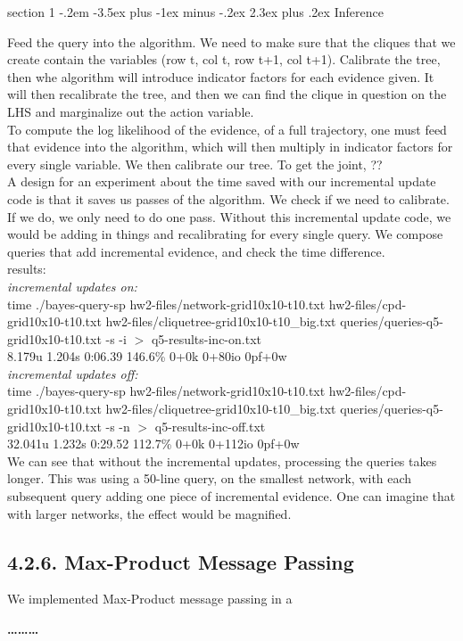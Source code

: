 \documentclass[12pt]{article}
\makeatletter
\newenvironment{problem}{\@startsection
       {section}
       {1}
       {-.2em}
       {-3.5ex plus -1ex minus -.2ex}
       {2.3ex plus .2ex}
       {\pagebreak[3]%
       \large\bf\noindent{Problem }
       }
       }
       {%
       \begin{center}\large\bf \ldots\ldots\ldots\end{center}}
\makeatother
\begin{document}
\begin{problem}{Inference}

Feed the query into the algorithm.  We need to make sure that the cliques that we create contain the variables (row t, col t, row t+1, col t+1).  Calibrate the tree, then whe algorithm will introduce indicator factors for each evidence given.  It will then recalibrate the tree, and then we can find the clique in question on the LHS and marginalize out the action variable.\\

To compute the log likelihood of the evidence, of a full trajectory, one must feed that evidence into the algorithm, which will then multiply in indicator factors for every single variable.  We then calibrate our tree.  To get the joint, ?? \\

A design for an experiment about the time saved with our incremental update code is that it saves us passes of the algorithm.  We check if we need to calibrate.  If we do, we only need to do one pass.  Without this incremental update code, we would be adding in things and recalibrating for every single query.  We compose queries that add incremental evidence, and check the time difference.\\
\noindent results:\\
\noindent \textit{incremental updates on:}\\
time ./bayes-query-sp hw2-files/network-grid10x10-t10.txt hw2-files/cpd-grid10x10-t10.txt hw2-files/cliquetree-grid10x10-t10\_big.txt queries/queries-q5-grid10x10-t10.txt -s -i $>$ q5-results-inc-on.txt\\
8.179u 1.204s 0:06.39 146.6\%    0+0k 0+80io 0pf+0w\\
\noindent \textit{incremental updates off:}\\
time ./bayes-query-sp hw2-files/network-grid10x10-t10.txt hw2-files/cpd-grid10x10-t10.txt hw2-files/cliquetree-grid10x10-t10\_big.txt queries/queries-q5-grid10x10-t10.txt -s -n  $>$ q5-results-inc-off.txt\\
32.041u 1.232s 0:29.52 112.7\%   0+0k 0+112io 0pf+0w\\

We can see that without the incremental updates, processing the queries takes longer.  This was using a 50-line query, on the smallest network, with each subsequent query adding one piece of incremental evidence.  One can imagine that with larger networks, the effect would be magnified.

\subsection*{4.2.6. Max-Product Message Passing}
We implemented Max-Product message passing in a 

\end{problem}{}
\end{document}
